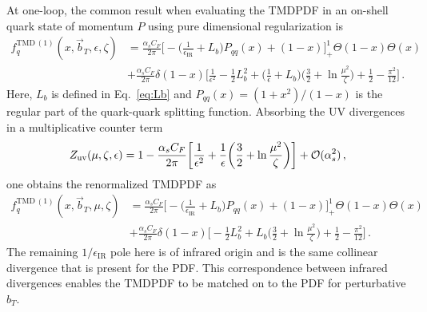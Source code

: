 \documentclass[11pt,a4paper]{article}
\DeclareRobustCommand{\eq}[1]{Eq.~\eqref{eq:#1}}
\newcommand{\eps}{\epsilon}
\newcommand{\cO}{\mathcal{O}}
\newcommand{\nn}{\nonumber}
\newcommand{\as}{\alpha_s}
\newcommand{\IR}{\mathrm{IR}}
\newcommand\TMD{\mathrm{TMD}}
\newcommand{\bt}{\vec b_T}
\begin{document}
At one-loop, the common result when evaluating the TMDPDF in an on-shell quark state of momentum $P$ using pure dimensional regularization is
\begin{align} \label{eq:tmdpdf_nlo}
 f_q^{\TMD\,(1)}(x, \bt, \epsilon, \zeta) &
 = \frac{\as C_F}{2\pi} \biggl[ - \biggl(\frac{1}{\eps_\IR} + L_b\biggr) P_{qq}(x) +  (1-x) \biggr]_+^1\Theta(1-x)\Theta(x)
 \\\nn&
  + \frac{\as C_F}{2\pi} \delta(1-x) \biggl[ \frac{1}{\eps^2} - \frac{1}{2} L_b^2
   + \biggl(\frac{1}{\eps} + L_b\biggr) \biggl(\frac{3}{2} + \ln\frac{\mu^2}{\zeta} \biggr)
   + \frac{1}{2} - \frac{\pi^2}{12} \biggr]
\,.\end{align}
Here, $L_b$ is defined in \eq{Lb} and $P_{qq}(x) = (1+x^2)/(1-x)$ is the regular part of the quark-quark splitting function.
%
Absorbing the UV divergences in a multiplicative counter term
\begin{align}
 Z_{\rm uv}(\mu,\zeta,\eps) = 1 - \frac{\as C_F}{2\pi} \biggl[ \frac{1}{\eps^2}
   + \frac{1}{\eps} \biggl(\frac{3}{2} + \ln\frac{\mu^2}{\zeta} \biggr) \biggr] + \cO(\as^2)
\,,\end{align}
one obtains the renormalized TMDPDF as
\begin{align} \label{eq:tmdpdf_nlo_renom}
 f_q^{\TMD\,(1)}(x, \bt, \mu, \zeta) &
 = \frac{\as C_F}{2\pi} \biggl[ - \biggl(\frac{1}{\eps_\IR} + L_b\biggr) P_{qq}(x) +  (1-x) \biggr]_+^1\Theta(1-x)\Theta(x)
 \\\nn&
  + \frac{\as C_F}{2\pi} \delta(1-x) \biggl[ - \frac{1}{2} L_b^2 + L_b \biggl(\frac{3}{2} + \ln\frac{\mu^2}{\zeta} \biggr) + \frac{1}{2} - \frac{\pi^2}{12} \biggr]
\,.\end{align}
The remaining $1/\eps_\IR$ pole here is of infrared origin and is the same collinear divergence that is present for the PDF. This correspondence between infrared divergences enables the TMDPDF to be matched on to the PDF for perturbative $b_T$.


\end{document}
